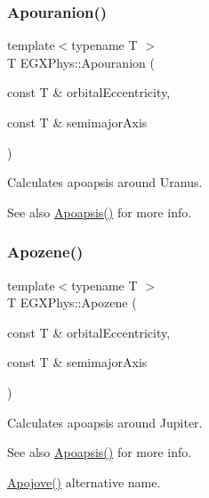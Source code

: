 \subsubsection{\texorpdfstring{Apouranion()}{Apouranion()}}
{\footnotesize\ttfamily template$<$typename T $>$ \\
T E\+G\+X\+Phys\+::\+Apouranion (\begin{DoxyParamCaption}\item[{const T \&}]{orbital\+Eccentricity,  }\item[{const T \&}]{semimajor\+Axis }\end{DoxyParamCaption})}



Calculates apoapsis around Uranus. 

\begin{DoxySeeAlso}{See also}
\mbox{\hyperlink{group___e_g_x_phys-_apoapsis_gaf962e650bf84a568458e8eb39b1c61ba}{Apoapsis()}} for more info. 
\end{DoxySeeAlso}
\mbox{\label{group___e_g_x_phys-_apoapsis_ga44d3dd8d8b350d053b25b7b1f1e15534}} 
\subsubsection{\texorpdfstring{Apozene()}{Apozene()}}
{\footnotesize\ttfamily template$<$typename T $>$ \\
T E\+G\+X\+Phys\+::\+Apozene (\begin{DoxyParamCaption}\item[{const T \&}]{orbital\+Eccentricity,  }\item[{const T \&}]{semimajor\+Axis }\end{DoxyParamCaption})}



Calculates apoapsis around Jupiter. 

\begin{DoxySeeAlso}{See also}
\mbox{\hyperlink{group___e_g_x_phys-_apoapsis_gaf962e650bf84a568458e8eb39b1c61ba}{Apoapsis()}} for more info. 

\mbox{\hyperlink{group___e_g_x_phys-_apoapsis_ga5a45d0a873514113aaa0adc95aefbbde}{Apojove()}} alternative name. 
\end{DoxySeeAlso}
